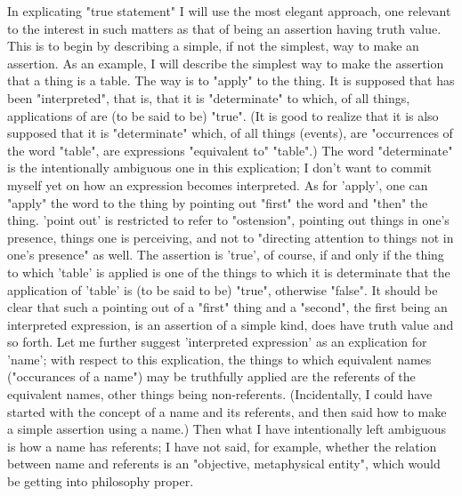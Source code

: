 \documentclass[10pt,twoside,draft]{memoir}
\begin{document}
In explicating "true statement" I will use the most elegant approach, one 
relevant to the interest in such matters as that of being an assertion having 
truth value. This is to begin by describing a simple, if not the simplest, way 
to make an assertion. As an example, I will describe the simplest way to 
make the assertion that a thing is a table. The way is to "apply"  to 
the thing. It is supposed that  has been "interpreted", that is, that it is 
"determinate" to which, of all things, applications of  are (to be said 
to be) "true". (It is good to realize that it is also supposed that it is 
"determinate" which, of all things (events), are "occurrences of the word 
"table", are expressions "equivalent to" "table".) The word "determinate" is 
the intentionally ambiguous one in this explication; I don't want to commit 
myself yet on how an expression becomes interpreted. As for 'apply', one 
can "apply" the word to the thing by pointing out "first" the word and 
"then" the thing. 'point out' is restricted to refer to "ostension", pointing 
out things in one's presence, things one is perceiving, and not to "directing 
attention to things not in one's presence" as well. The assertion is 'true', of 
course, if and only if the thing to which 'table' is applied is one of the things 
to which it is determinate that the application of 'table' is (to be said to be) 
"true", otherwise "false". It should be clear that such a pointing out of a 
"first" thing and a "second", the first being an interpreted expression, is an 
assertion of a simple kind, does have truth value and so forth. Let me further 
suggest 'interpreted expression' as an explication for 'name'; with respect to 
this explication, the things to which equivalent names ("occurances of a 
name") may be truthfully applied are the referents of the equivalent names, 
other things being non-referents. (Incidentally, I could have started with the 
concept of a name and its referents, and then said how to make a simple 
assertion using a name.) Then what I have intentionally left ambiguous is 
how a name has referents; I have not said, for example, whether the relation 
between name and referents is an "objective, metaphysical entity", which 
would be getting into philosophy proper. 
\end{document}
